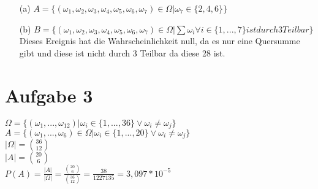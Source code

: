 \documentclass[10pt,a4paper]{article}
\begin{document}
\begin{itemize}
\item[(a)] $A = \{(\omega_{1},\omega_{2},\omega_{3},\omega_{4},\omega_{5},\omega_{6},\omega_{7}) \in \Omega | \omega_{7} \in \{2,4,6\}  \}$
\item[(b)] $B = \{(\omega_{1},\omega_{2},\omega_{3},\omega_{4},\omega_{5},\omega_{6},\omega_{7}) \in \Omega |\sum \omega_{i} \forall i \in\{1,...,7\} ist durch 3 Teilbar \}$ Dieses Ereignis hat die Wahrscheinlichkeit null, da es nur eine Quersumme gibt und diese ist nicht durch 3 Teilbar da diese 28 ist.
\end{itemize}

\section*{Aufgabe 3}
$\Omega = \{(\omega_{1},...,\omega_{12}) | \omega_{i} \in \{1,...,36\} \vee \omega_{i} \neq \omega_{j} \}$ \\
$A = \{(\omega_{1},...,\omega_{6}) \in \Omega|\omega_{i} \in \{1,...,20\} \vee \omega_{i} \neq \omega_{j} \}$ \\

$|\Omega| = \binom{36}{12} $ \\
$|A| = \binom{20}{6}$ \\

$P(A) = \frac{|A|}{|\Omega|} = \frac{\binom{20}{6}}{\binom{36}{12}}= \frac{38}{1227135} = 3,097*10^{-5}$
\end{document}
